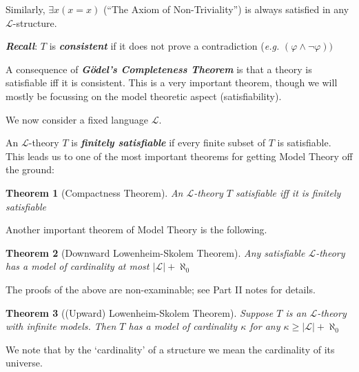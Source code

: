 \documentclass[]{article}
\theoremstyle{custhm}
\theoremstyle{cusdef}
\theoremstyle{custhm}
\theoremstyle{custhm}
\theoremstyle{custhm}
\theoremstyle{ex}
\theoremstyle{custhm}
\newtheorem*{theorem*}{Theorem}
\theoremstyle{cusdef}
\theoremstyle{remark}
\theoremstyle{remark}
\newcommand{\undf}[1]{\textit{\textbf{#1}}}
\renewcommand{\L}{\mathcal{L}}
\renewcommand{\it}[1]{\textit{#1}}
\renewcommand{\phi}{\varphi}
\renewcommand{\lnot}{\neg}
\begin{document}
Similarly, $\exists x(x=x)$ (``The Axiom of Non-Triviality'') is always satisfied in any $\L$-structure.

\undf{Recall}: $T$ is \undf{consistent} if it does not prove a contradiction (\it{e.g.} $(\phi\land\lnot\phi))$

A consequence of \undf{G{\"o}del's Completeness Theorem} is that a theory is satisfiable iff it is consistent. This is a very important theorem, though we will mostly be focussing on the model theoretic aspect (satisfiability).


We now consider a fixed language $\L$.

An $\L$-theory $T$ is \undf{finitely satisfiable} if every finite subset of $T$ is satisfiable. This leads us to one of the most important theorems for getting Model Theory off the ground:

\begin{theorem*}[Compactness Theorem]
An $\L$-theory $T$ satisfiable iff it is finitely satisfiable
\end{theorem*}

Another important theorem of Model Theory is the following.

\begin{theorem*}[Downward Lowenheim-Skolem Theorem]
	Any satisfiable $\L$-theory has a model of cardinality at most $|\L|+\aleph_0$
\end{theorem*}

The proofs of the above are non-examinable; see Part II notes for details.

\begin{theorem*}[(Upward) Lowenheim-Skolem  Theorem]
Suppose $T$ is an $\L$-theory with infinite models. Then $T$ has a model of cardinality $\kappa$ for any $\kappa \ge |\L|+\aleph_0$
\end{theorem*}

We note that by the `cardinality' of a structure we mean the cardinality of its universe.
\end{document}
